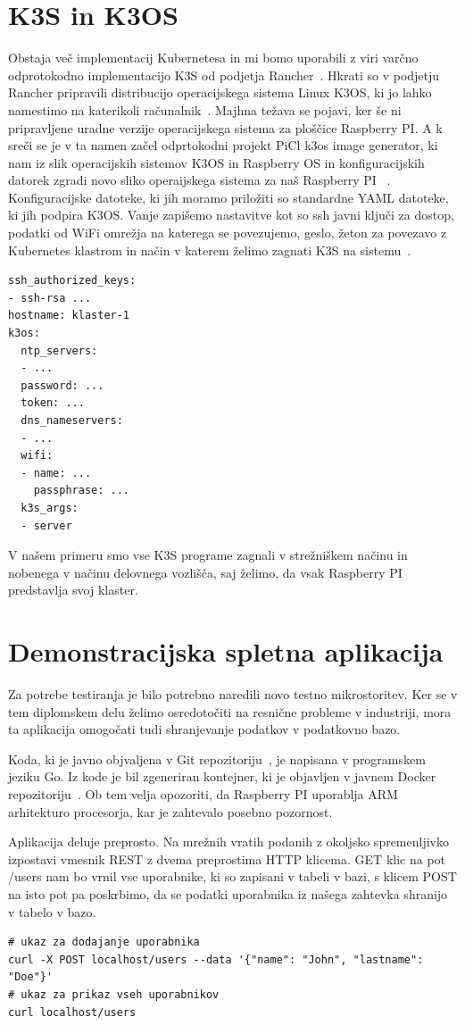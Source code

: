 \documentclass[a4paper, 12pt]{book}
\begin{document}
\section{K3S in K3OS}
Obstaja več implementacij Kubernetesa in mi bomo uporabili z viri varčno odprotokodno implementacijo K3S od podjetja Rancher~\cite{k3s-info}.
Hkrati so v podjetju Rancher pripravili distribucijo operacijskega sistema Linux K3OS, ki jo lahko namestimo na katerikoli računalnik~\cite{k3os-git}. 
Majhna težava se pojavi, ker še ni pripravljene uradne verzije operacijskega sistema za ploščice Raspberry PI.
A k sreči se je v ta namen začel odprtokodni projekt PiCl k3os image generator, ki nam iz slik operacijskih sistemov K3OS in Raspberry OS in konfiguracijskih datorek zgradi novo sliko operaijskega sistema za naš Raspberry PI ~\cite{k3os-rpi-image-generator}.
Konfiguracijske datoteke, ki jih moramo priložiti so standardne YAML datoteke, ki jih podpira K3OS.
Vanje zapišemo nastavitve kot so ssh javni ključi za dostop, podatki od WiFi omrežja na katerega se povezujemo, geslo, žeton za povezavo z Kubernetes klastrom in način v katerem želimo zagnati K3S na sistemu~\cite{k3os-git}.
\begin{verbatim}
ssh_authorized_keys:
- ssh-rsa ...
hostname: klaster-1
k3os:
  ntp_servers:
  - ...
  password: ...
  token: ...
  dns_nameservers:
  - ... 
  wifi:
  - name: ...
    passphrase: ...
  k3s_args:
  - server
\end{verbatim}
V našem primeru smo vse K3S programe zagnali v strežniškem načinu in nobenega v načinu delovnega vozlišča, saj želimo, da vsak Raspberry PI predstavlja svoj klaster.
\section{Demonstracijska spletna aplikacija}
Za potrebe testiranja je bilo potrebno naredili novo testno mikrostoritev.
Ker se v tem diplomskem delu želimo osredotočiti na resnične probleme v industriji, mora ta aplikacija omogočati tudi shranjevanje podatkov v podatkovno bazo.

Koda, ki je javno objvaljena v Git repozitoriju~\cite{git-stateful-rest-sample}, je napisana v programskem jeziku Go.
Iz kode je bil zgeneriran kontejner, ki je objavljen v javnem Docker repozitoriju~\cite{docker-stateful-rest-sample}.
Ob tem velja opozoriti, da Raspberry PI uporablja ARM arhitekturo procesorja, kar je zahtevalo posebno pozornost.

Aplikacija deluje preprosto.
Na mrežnih vratih podanih z okoljsko spremenljivko izpostavi vmesnik REST z dvema preprostima HTTP klicema.
GET klic na pot /users nam bo vrnil vse uporabnike, ki so zapisani v tabeli v bazi, s klicem POST na isto pot pa poskrbimo, da se podatki uporabnika iz našega zahtevka shranijo v tabelo v bazo.
\begin{verbatim}
# ukaz za dodajanje uporabnika
curl -X POST localhost/users --data '{"name": "John", "lastname": "Doe"}'
# ukaz za prikaz vseh uporabnikov
curl localhost/users
\end{verbatim}
\end{document}
